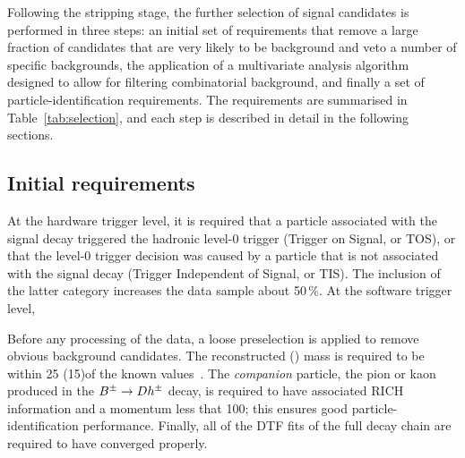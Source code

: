 Following the stripping stage, the further selection of signal candidates is performed in three steps: an initial set of requirements that remove a large fraction of candidates that are very likely to be background and veto a number of specific backgrounds, the application of a multivariate analysis algorithm designed to allow for filtering combinatorial background, and finally a set of particle-identification requirements. The requirements are summarised in Table~\ref{tab:selection}, and each step is described in detail in the following sections.



\subsection{Initial requirements} %
\label{sub:initial_requirements}

At the hardware trigger level, it is required that a particle associated with the signal decay triggered the hadronic level-0 trigger (Trigger on Signal, or TOS), or that the level-0 trigger decision was caused by a particle that is not associated with the signal decay (Trigger Independent of Signal, or TIS). The inclusion of the latter category increases the data sample about 50\,\%. At the software trigger level, 

Before any processing of the data, a loose preselection is applied to remove obvious background candidates. The reconstructed \D (\KS) mass is required to be within 25 (15)\mevcc of the known values~\cite{PDG2020}. The \emph{companion} particle, the pion or kaon produced in the ${{B}^\pm}\rightarrow{\ensuremath{D}} h^\pm$ decay, is required to have associated RICH information and a momentum less that 100\gevc; this ensures good particle-identification performance. Finally, all of the DTF fits of the full decay chain are required to have converged properly.

